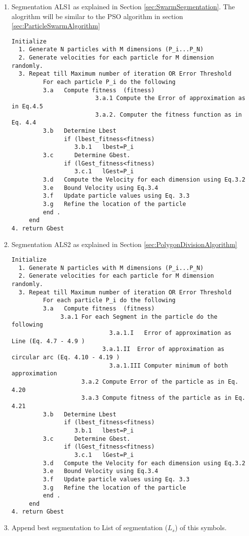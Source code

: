 \begin{enumerate}
\item Segmentation ALS1 as explained in Section \ref{sec:SwarmSegmentation}. The alogrithm will be similar to the PSO algorithm  in section \ref{sec:ParticleSwarmAlgorithm} 
\begin{verbatim}
Initialize 
  1. Generate N particles with M dimensions (P_i...P_N) 
  2. Generate velocities for each particle for M dimension randomly. 
  3. Repeat till Maximum number of iteration OR Error Threshold  
         For each particle P_i do the following 
         3.a   Compute fitness  (fitness) 
         				3.a.1 Compute the Error of approximation as in Eq.4.5
         				3.a.2. Computer the fitness function as in Eq. 4.4 
         3.b   Determine Lbest  
               if (lbest_fitness<fitness)
                  3.b.1   lbest=P_i
         3.c      Determine Gbest.
               if (lGest_fitness<fitness)
                  3.c.1   lGest=P_i
         3.d   Compute the Velocity for each dimension using Eq.3.2 
         3.e   Bound Velocity using Eq.3.4
         3.f   Update particle values using Eq. 3.3
         3.g   Refine the location of the particle 
         end .
     end 
4. return Gbest
\end{verbatim}	
\item Segmentation ALS2  as explained in Section \ref{sec:PolygonDivisionAlgorithm}
\begin{verbatim}
Initialize 
  1. Generate N particles with M dimensions (P_i...P_N) 
  2. Generate velocities for each particle for M dimension randomly. 
  3. Repeat till Maximum number of iteration OR Error Threshold  
         For each particle P_i do the following 
         3.a   Compute fitness  (fitness) 
              3.a.1 For each Segment in the particle do the following
         				    3.a.1.I   Error of approximation as Line (Eq. 4.7 - 4.9 )
         			      3.a.1.II  Error of approximation as circular arc (Eq. 4.10 - 4.19 )
         				    3.a.1.III Computer minimum of both approximation 
         			3.a.2 Compute Error of the particle as in Eq.  4.20
         			3.a.3 Compute fitness of the particle as in Eq. 4.21
         3.b   Determine Lbest  
               if (lbest_fitness<fitness)
                  3.b.1   lbest=P_i
         3.c      Determine Gbest.
               if (lGest_fitness<fitness)
                  3.c.1   lGest=P_i
         3.d   Compute the Velocity for each dimension using Eq.3.2 
         3.e   Bound Velocity using Eq.3.4
         3.f   Update particle values using Eq. 3.3
         3.g   Refine the location of the particle 
         end .
     end 
4. return Gbest
\end{verbatim}	
\item Append best segmentation to List of segmentation ($L_s$) of this symbols. 
\end{enumerate}

